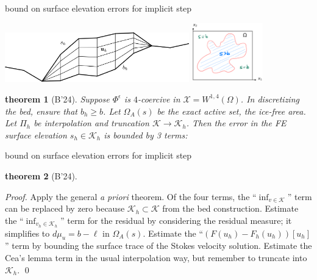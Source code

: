 \documentclass[10pt,svgnames]{beamer}
\newtheorem*{thm}{theorem}
\newcommand{\cK}{\mathcal{K}}
\newcommand{\cX}{\mathcal{X}}
\newcommand{\eps}{\epsilon}
\begin{document}
\begin{frame}{bound on surface elevation errors for implicit step}

\noindent \includegraphics[width=0.6\textwidth]{extruded} \hfill \includegraphics[width=0.23\textwidth]{mapplane}

\medskip
\begin{thm}[B'24]
Suppose $\Phi^\eps$ is $4$-coercive in $\cX = W^{1,4}(\Omega)$.  In discretizing the bed, ensure that $b_h\ge b$.  Let $\Omega_A(s)$ be the exact active set, the ice-free area.  Let $\Pi_h$ be interpolation and truncation $\cK \to \cK_h$.  Then the error in the FE surface elevation $s_h\in\cK_h$ is bounded by 3 terms:
\result
\end{thm}
\end{frame}


\begin{frame}{bound on surface elevation errors for implicit step}

\begin{thm}[B'24]
\result
\end{thm}

\noindent \emph{Proof.} Apply the general \emph{a priori} theorem.  Of the four terms, the ``$\inf_{v\in \cK}$'' term can be replaced by zero because $\cK_h\subset \cK$ from the bed construction.  Estimate the ``$\inf_{v_h\in\cK_h}$'' term for the residual by considering the residual measure; it simplifies to $d\mu_u=b-\ell$ in $\Omega_A(s)$.  Estimate the ``$(F(u_h)-F_h(u_h))[u_h]$'' term by bounding the surface trace of the Stokes velocity solution.  Estimate the Cea's lemma term in the usual interpolation way, but remember to truncate into $\cK_h$. \qed
\end{frame}
\end{document}
